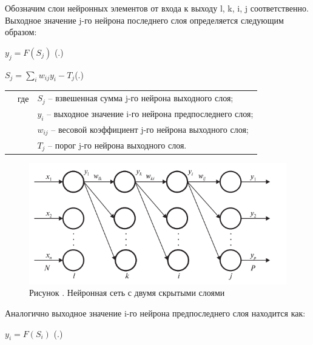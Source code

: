 {	\par \redline Обозначим слои нейронных элементов от входа к выходу l, k, i, j соответственно. Выходное значение j-го нейрона последнего слоя определяется следующим образом:
	
	\formulaspace \par \redline 
	$y_{j} = F(S_{j}) $
	\hfill (\thechaptercntr .\theformulacntr) \redline
	\formulaspace \addtocounter{formulacntr}{1}
	
	\formulaspace \par \redline 
	$S_{j} = \sum \limits _{i}^{} w_{ij}y_{i} - T_{j}$\hfill (\thechaptercntr .\theformulacntr) \redline
	\formulaspace \addtocounter{formulacntr}{1}
	
	\begin{tabular}{p{}p{}p{}}
		& где  & $S_{j}$ {--} взвешенная сумма j-го нейрона выходного слоя; \\
		&      & $y_{i}$ {--} выходное значение i-го нейрона предпоследнего слоя; \\
		&      & $w_{ij}$ {--} весовой коэффициент j-го нейрона выходного слоя; \\
		&      & $T_{j}$ {--} порог j-го нейрона выходного слоя. \\
	\end{tabular}
	
	\begin{figure}[H]
		\centering
		\def\svgwidth{\textwidth}
		\includegraphics[scale=1.2]{images/bpe_perceptron.png}
		\caption*{\gostFont Рисунок \thechaptercntr .\theimagecntr \spc {--} Нейронная сеть с двумя скрытыми слоями}
	\end{figure}  \addtocounter{imagecntr}{1}
	
	
	\par \redline Аналогично выходное значение i-го нейрона предпоследнего слоя находится как:
	
		\formulaspace \par \redline 
	$y_{i} = F(S_{i}) $
	\hfill (\thechaptercntr .\theformulacntr) \redline
	\formulaspace \addtocounter{formulacntr}{1}
	
}
